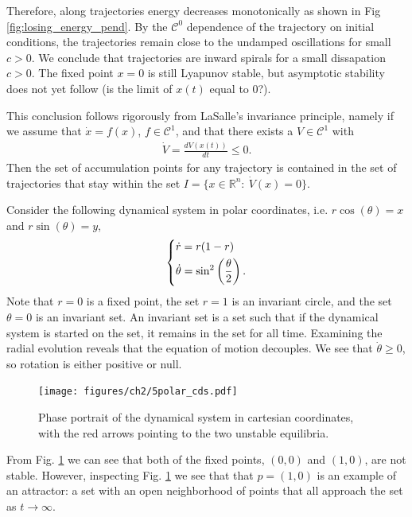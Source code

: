\begin{ex}
Therefore, along trajectories energy decreases monotonically as shown in Fig \ref{fig:losing_energy_pend}. By the $\mathcal{C}^0$ dependence of the trajectory on initial conditions, the trajectories remain close to the undamped oscillations for small $c>0$. We conclude that trajectories are inward spirals for a small dissapation $c>0$. The fixed point $ {x}=0$ is still Lyapunov stable, but asymptotic stability does not yet follow (is the limit of $ {x}(t)$ equal to 0?).
\begin{remark}
	This conclusion follows rigorously from LaSalle's invariance principle, namely if we assume that $\dot{ {x}}=f( {x})$, $f \in \mathcal{C}^1$, and that there exists a $V\in \mathcal{C}^1$ with 
	\begin{align}
		\dot{V} = \frac{dV( {x}(t))}{dt} \leq 0.	
	\end{align}
	Then the set of accumulation points for any trajectory is contained in the set of trajectories that stay within the set $I=\{ {x} \in \mathbb{R}^{n}:\ \dot{V}( {x}) = 0\}$.
\end{remark}
\end{ex}

\begin{ex}[]
	Consider the following dynamical system in polar coordinates, i.e. $r\cos(\theta) = x$ and $r \sin(\theta) = y$,
	\begin{align}
		\begin{dcases}
			\dot{r} = r(1-r) \\ \dot{\theta} = \sin^2\left( \frac{\theta}{2} \right).
		\end{dcases}
	\end{align}
	Note that $r=0$ is a fixed point, the set $r=1$ is an invariant circle, and the set $\theta=0$ is an invariant set. An invariant set is a set such that if the dynamical system is started on the set, it remains in the set for all time. Examining the radial evolution reveals that the equation of motion decouples. We see that $\dot{\theta}\geq 0$, so rotation is either positive or null.
	\begin{figure}[h!]
		\centering
		\texttt{[image: figures/ch2/5polar\_cds.pdf]}
		\caption{Phase portrait of the dynamical system in cartesian coordinates, with the red arrows pointing to the two unstable equilibria.}
		\label{fig:polar_attractor}
	\end{figure}

	 From Fig. \ref{fig:polar_attractor} we can see that both of the fixed points, $(0,0)$ and $(1,0)$, are not stable. However, inspecting Fig. \ref{fig:polar_attractor} we see that that $p=(1,0)$ is an example of an attractor: a set with an open neighborhood of points that all approach the set as $t\to \infty $.
\end{ex}

